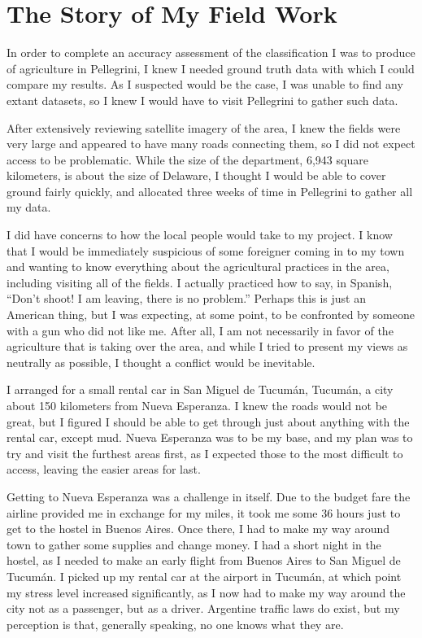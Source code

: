 \chapter{The Story of My Field Work}
\label{appendix:fieldwork}

In order to complete an accuracy assessment of the classification I was to produce of agriculture in Pellegrini, I knew I needed ground truth data with which I could compare my results. As I suspected would be the case, I was unable to find any extant datasets, so I knew I would have to visit Pellegrini to gather such data.

After extensively reviewing satellite imagery of the area, I knew the fields were very large and appeared to have many roads connecting them, so I did not expect access to be problematic. While the size of the department, 6,943 square kilometers, is about the size of Delaware, I thought I would be able to cover ground fairly quickly, and allocated three weeks of time in Pellegrini to gather all my data.

I did have concerns to how the local people would take to my project. I know that I would be immediately suspicious of some foreigner coming in to my town and wanting to know everything about the agricultural practices in the area, including visiting all of the fields. I actually practiced how to say, in Spanish, ``Don’t shoot! I am leaving, there is no problem.'' Perhaps this is just an American thing, but I was expecting, at some point, to be confronted by someone with a gun who did not like me. After all, I am not necessarily in favor of the agriculture that is taking over the area, and while I tried to present my views as neutrally as possible, I thought a conflict would be inevitable.

I arranged for a small rental car in San Miguel de Tucumán, Tucumán, a city about 150 kilometers from Nueva Esperanza. I knew the roads would not be great, but I figured I should be able to get through just about anything with the rental car, except mud. Nueva Esperanza was to be my base, and my plan was to try and visit the furthest areas first, as I expected those to the most difficult to access, leaving the easier areas for last.

Getting to Nueva Esperanza was a challenge in itself. Due to the budget fare the airline provided me in exchange for my miles, it took me some 36 hours just to get to the hostel in Buenos Aires. Once there, I had to make my way around town to gather some supplies and change money. I had a short night in the hostel, as I needed to make an early flight from Buenos Aires to San Miguel de Tucumán. I picked up my rental car at the airport in Tucumán, at which point my stress level increased significantly, as I now had to make my way around the city not as a passenger, but as a driver. Argentine traffic laws do exist, but my perception is that, generally speaking, no one knows what they are.


